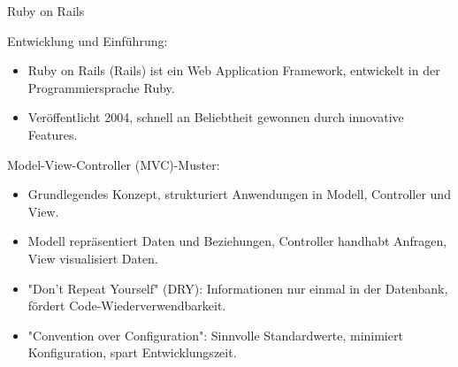 \documentclass{beamer}
\begin{document}
\begin{frame}{Ruby on Rails}

Entwicklung und Einführung:
  \begin{itemize}
    \item Ruby on Rails (Rails) ist ein Web Application Framework, entwickelt in der Programmiersprache Ruby.
    \item Veröffentlicht 2004, schnell an Beliebtheit gewonnen durch innovative Features.
  \end{itemize}


Model-View-Controller (MVC)-Muster:

  \begin{itemize}
    \item Grundlegendes Konzept, strukturiert Anwendungen in Modell, Controller und View.
    \item Modell repräsentiert Daten und Beziehungen, Controller handhabt Anfragen, View visualisiert Daten.
  \end{itemize}

  \begin{itemize}
    \item "Don't Repeat Yourself" (DRY): Informationen nur einmal in der Datenbank, fördert Code-Wiederverwendbarkeit.
    \item "Convention over Configuration": Sinnvolle Standardwerte, minimiert Konfiguration, spart Entwicklungszeit.
  \end{itemize}
\end{frame}
\end{document}
